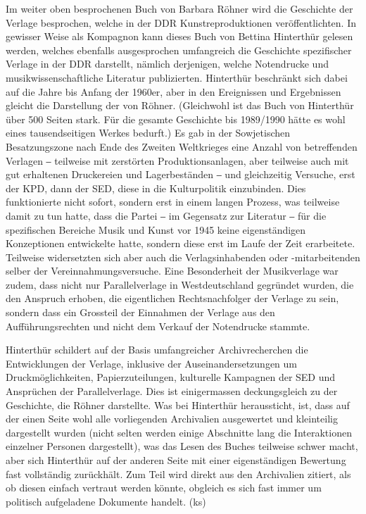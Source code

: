 \documentclass[a4paper,
fontsize=11pt,
oneside,
numbers=noperiodatend,
parskip=half-,
bibliography=totoc,
final
]{scrartcl}
\begin{document}
Im weiter oben besprochenen Buch von Barbara Röhner wird die Geschichte
der Verlage besprochen, welche in der DDR Kunstreproduktionen
veröffentlichten. In gewisser Weise als Kompagnon kann dieses Buch von
Bettina Hinterthür gelesen werden, welches ebenfalls ausgesprochen
umfangreich die Geschichte spezifischer Verlage in der DDR darstellt,
nämlich derjenigen, welche Notendrucke und musikwissenschaftliche
Literatur publizierten. Hinterthür beschränkt sich dabei auf die Jahre
bis Anfang der 1960er, aber in den Ereignissen und Ergebnissen gleicht
die Darstellung der von Röhner. (Gleichwohl ist das Buch von Hinterthür
über 500 Seiten stark. Für die gesamte Geschichte bis 1989/1990 hätte es
wohl eines tausendseitigen Werkes bedurft.) Es gab in der Sowjetischen
Besatzungszone nach Ende des Zweiten Weltkrieges eine Anzahl von
betreffenden Verlagen ‒ teilweise mit zerstörten Produktionsanlagen,
aber teilweise auch mit gut erhaltenen Druckereien und Lagerbeständen ‒
und gleichzeitig Versuche, erst der KPD, dann der SED, diese in die
Kulturpolitik einzubinden. Dies funktionierte nicht sofort, sondern erst
in einem langen Prozess, was teilweise damit zu tun hatte, dass die
Partei ‒ im Gegensatz zur Literatur ‒ für die spezifischen Bereiche
Musik und Kunst vor 1945 keine eigenständigen Konzeptionen entwickelte
hatte, sondern diese erst im Laufe der Zeit erarbeitete. Teilweise
widersetzten sich aber auch die Verlagsinhabenden oder -mitarbeitenden
selber der Vereinnahmungsversuche. Eine Besonderheit der Musikverlage
war zudem, dass nicht nur Parallelverlage in Westdeutschland gegründet
wurden, die den Anspruch erhoben, die eigentlichen Rechtsnachfolger der
Verlage zu sein, sondern dass ein Grossteil der Einnahmen der Verlage
aus den Aufführungsrechten und nicht dem Verkauf der Notendrucke
stammte.

Hinterthür schildert auf der Basis umfangreicher Archivrecherchen die
Entwicklungen der Verlage, inklusive der Auseinandersetzungen um
Druckmöglichkeiten, Papierzuteilungen, kulturelle Kampagnen der SED und
Ansprüchen der Parallelverlage. Dies ist einigermassen deckungsgleich zu
der Geschichte, die Röhner darstellte. Was bei Hinterthür heraussticht,
ist, dass auf der einen Seite wohl alle vorliegenden Archivalien
ausgewertet und kleinteilig dargestellt wurden (nicht selten werden
einige Abschnitte lang die Interaktionen einzelner Personen
dargestellt), was das Lesen des Buches teilweise schwer macht, aber sich
Hinterthür auf der anderen Seite mit einer eigenständigen Bewertung fast
vollständig zurückhält. Zum Teil wird direkt aus den Archivalien
zitiert, als ob diesen einfach vertraut werden könnte, obgleich es sich
fast immer um politisch aufgeladene Dokumente handelt. (ks)
\end{document}
